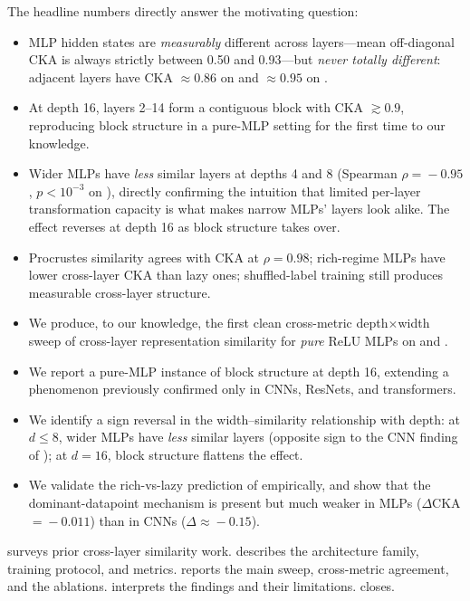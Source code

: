  The headline numbers directly answer the motivating question:
\begin{itemize}[leftmargin=*,itemsep=0pt,topsep=0pt]
    \item MLP hidden states are \emph{measurably} different across layers---mean off-diagonal CKA is always strictly between 0.50 and 0.93---but \emph{never totally different}: adjacent layers have CKA $\approx\!0.86$ on \cifar and $\approx\!0.95$ on \mnist.
    \item At depth 16, layers 2--14 form a contiguous block with CKA $\gtrsim\!0.9$, reproducing block structure in a pure-MLP setting for the first time to our knowledge.
    \item Wider MLPs have \emph{less} similar layers at depths 4 and 8 (Spearman $\rho\!=\!-0.95$, $p\!<\!10^{-3}$ on \cifar), directly confirming the intuition that limited per-layer transformation capacity is what makes narrow MLPs' layers look alike. The effect reverses at depth 16 as block structure takes over.
    \item Procrustes similarity agrees with CKA at $\rho\!=\!0.98$; rich-regime MLPs have lower cross-layer CKA than lazy ones; shuffled-label training still produces measurable cross-layer structure.
\end{itemize}

\begin{itemize}[leftmargin=*,itemsep=0pt,topsep=0pt]
    \item We produce, to our knowledge, the first clean cross-metric depth$\times$width sweep of cross-layer representation similarity for \emph{pure} ReLU MLPs on \cifar and \mnist.
    \item We report a pure-MLP instance of block structure at depth 16, extending a phenomenon previously confirmed only in CNNs, ResNets, and transformers.
    \item We identify a sign reversal in the width--similarity relationship with depth: at $d\!\leq\!8$, wider MLPs have \emph{less} similar layers (opposite sign to the CNN finding of \citet{kornblith2019similarity}); at $d\!=\!16$, block structure flattens the effect.
    \item We validate the rich-vs-lazy prediction of \citet{tong2025richness} empirically, and show that the \citet{nguyen2022origins} dominant-datapoint mechanism is present but much weaker in MLPs ($\Delta$CKA $=\!-0.011$) than in CNNs ($\Delta \approx\!-0.15$).
\end{itemize}

  surveys prior cross-layer similarity work.  describes the architecture family, training protocol, and metrics.  reports the main sweep, cross-metric agreement, and the ablations.  interprets the findings and their limitations.  closes.
